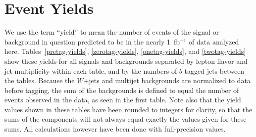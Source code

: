 %
\section{Event Yields}
\label{event-yields}

We use the term ``yield'' to mean the number of events of the signal
or background in question predicted to be in the nearly 1~fb$^{-1}$ of
data analyzed here. Tables~\ref{pretag-yields}, \ref{zerotag-yields},
\ref{onetag-yields}, and \ref{twotag-yields} show these yields for all
signals and backgrounds separated by lepton flavor and jet
multiplicity within each table, and by the numbers of $b$-tagged jets
between the tables. Because the $W$+jets and multijet backgrounds are
normalized to data before tagging, the sum of the backgrounds is
defined to equal the number of events observed in the data, as seen in
the first table. Note also that the yield values shown in these tables
have been rounded to integers for clarity, so that the sums of the
components will not always equal exactly the values given for these
sums. All calculations however have been done with full-precision
values.


